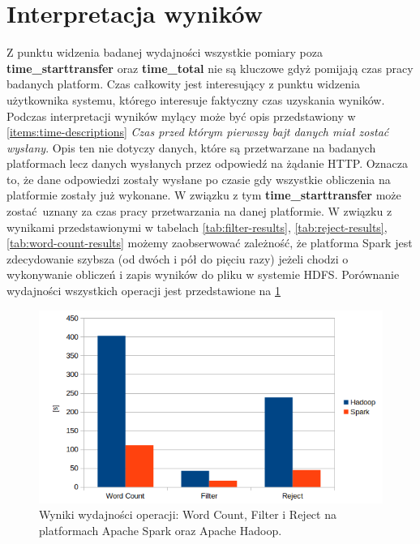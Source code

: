 \section{Interpretacja wyników}
Z punktu widzenia badanej wydajności wszystkie pomiary poza \textbf{time\_starttransfer} oraz \textbf{time\_total} nie są kluczowe gdyż pomijają czas pracy badanych platform. Czas całkowity jest interesujący z punktu widzenia użytkownika systemu, którego interesuje faktyczny czas uzyskania wyników. Podczas interpretacji wyników mylący może być opis przedstawiony w \ref{items:time-descriptions} \textit{Czas przed którym pierwszy bajt danych miał zostać wysłany}. Opis ten nie dotyczy danych, które są przetwarzane na badanych platformach lecz danych wysłanych przez odpowiedź na żądanie HTTP. Oznacza to, że dane odpowiedzi zostały wysłane po czasie gdy wszystkie obliczenia na platformie zostały już wykonane. W związku z tym \textbf{time\_starttransfer} może zostać uznany za czas pracy przetwarzania na danej platformie.
\newline W związku z wynikami przedstawionymi w tabelach \ref{tab:filter-results}, \ref{tab:reject-results}, \ref{tab:word-count-results} możemy zaobserwować zależność, że platforma Spark jest zdecydowanie szybsza (od dwóch i pół do pięciu razy) jeżeli chodzi o wykonywanie obliczeń i zapis wyników do pliku w systemie HDFS. Porównanie wydajności wszystkich operacji jest przedstawione na \ref{fig:results-comparison-bar}
\begin{figure}[!htb]
	\centering
	\includegraphics[scale=0.6]{results-comparison-bar.png}
	\caption{Wyniki wydajności operacji: Word Count, Filter i Reject na platformach Apache Spark oraz Apache Hadoop.}
	\label{fig:results-comparison-bar}
\end{figure}   
